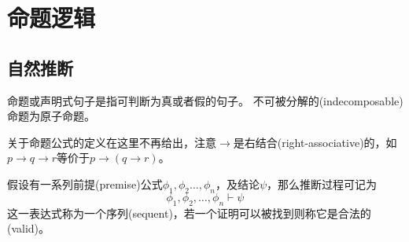 
\section{命题逻辑}
\subsection{自然推断}
\begin{definition}[命题(proposition)]
命题或声明式句子是指可判断为真或者假的句子。
不可被分解的(indecomposable)命题为原子命题。
\end{definition}

关于命题公式的定义在这里不再给出，注意$\to$是右结合(right-associative)的，如$p\to q\to r$等价于$p\to(q\to r)$。

\begin{definition}
假设有一系列前提(premise)公式$\phi_1,\phi_2\ldots,\phi_n$，及结论$\psi$，那么推断过程可记为
\[\phi_1,\phi_2,\ldots,\phi_n\vdash\psi\]
这一表达式称为一个序列(sequent)，若一个证明可以被找到则称它是合法的(valid)。
\end{definition}

